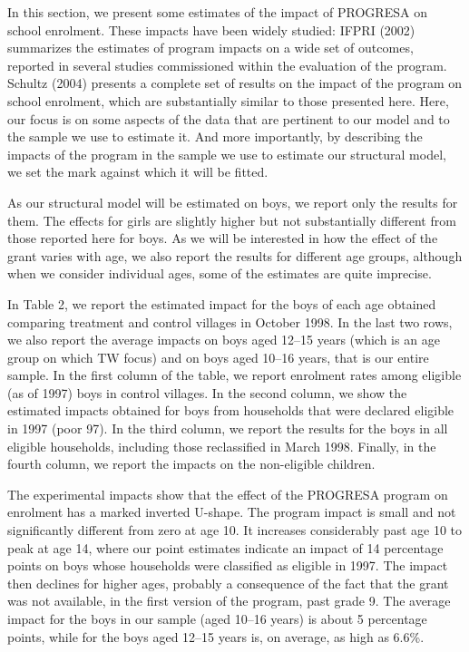 \documentclass{handoutForSolutions}
\begin{document}
In this section, we present some estimates of the impact of PROGRESA on school enrolment. These impacts have been widely studied: IFPRI (2002) summarizes the estimates of program impacts on a wide set of outcomes, reported in several studies commissioned within the evaluation of the program. Schultz (2004) presents a complete set of results on the impact of the program on school enrolment, which are substantially similar to those presented here. Here, our focus is on some aspects of the data that are pertinent to our model and to the sample we use to estimate it. And more importantly, by describing the impacts of the program in the sample we use to estimate our structural model, we set the mark against which it will be fitted.

As our structural model will be estimated on boys, we report only the results for them. The effects for girls are slightly higher but not substantially different from those reported here for boys. As we will be interested in how the effect of the grant varies with age, we also report the results for different age groups, although when we consider individual ages, some of the estimates are quite imprecise.

In Table 2, we report the estimated impact for the boys of each age obtained comparing treatment and control villages in October 1998. In the last two rows, we also report the average impacts on boys aged 12–15 years (which is an age group on which TW focus) and on boys aged 10–16 years, that is our entire sample. In the first column of the table, we report enrolment rates among eligible (as of 1997) boys in control villages. In the second column, we show the estimated impacts obtained for boys from households that were declared eligible in 1997 (poor 97). In the third column, we report the results for the boys in all eligible households, including those reclassified in March 1998. Finally, in the fourth column, we report the impacts on the non-eligible children.

The experimental impacts show that the effect of the PROGRESA program on enrolment has a marked inverted U-shape. The program impact is small and not significantly different from zero at age 10. It increases considerably past age 10 to peak at age 14, where our point estimates indicate an impact of 14 percentage points on boys whose households were classified as eligible in 1997. The impact then declines for higher ages, probably a consequence of the fact that the grant was not available, in the first version of the program, past grade 9. The average impact for the boys in our sample (aged 10–16 years) is about 5 percentage points, while for the boys aged 12–15 years is, on average, as high as 6.6\%.
\end{document}
